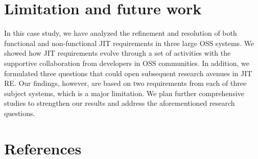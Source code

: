 \documentclass[review]{elsarticle}
\begin{document}
\section{Limitation and future work}
In this case study, we have analyzed the refinement and resolution of both functional and non-functional JIT requirements in three large OSS systems. We showed how JIT requirements evolve through a set of activities with the supportive collaboration from developers in OSS communities. In addition, we formulated three questions that could open subsequent research avenues in JIT RE. Our findings, however, are based on two requirements from each of three subject systems, which is a major limitation. We plan further comprehensive studies to strengthen our results and address the aforementioned research questions.

\section*{References}


\end{document}
